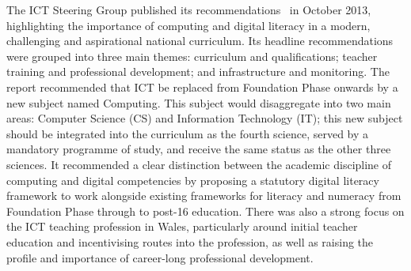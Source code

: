 \documentclass{llncs}
\begin{document}




The ICT Steering Group published its
recommendations~\cite{welshictreview:2013} in October 2013,
highlighting the importance of computing and digital literacy in a
modern, challenging and aspirational national curriculum. Its headline
recommendations were grouped into three main themes: curriculum and
qualifications; teacher training and professional development; and
infrastructure and monitoring. The report recommended that ICT be
replaced from Foundation Phase onwards by a new subject named
Computing.  This subject would disaggregate into two main areas:
Computer Science (CS) and Information Technology (IT); this new
subject should be integrated into the curriculum as the fourth
science, served by a mandatory programme of study, and receive the
same status as the other three sciences. It recommended a clear
distinction between the academic discipline of computing and digital
competencies by proposing a statutory digital literacy framework to
work alongside existing frameworks for literacy and numeracy from
Foundation Phase through to post-16 education. There was also a strong
focus on the ICT teaching profession in Wales, particularly around
initial teacher education and incentivising routes into the
profession, as well as raising the profile and importance of
career-long professional development.
\end{document}
